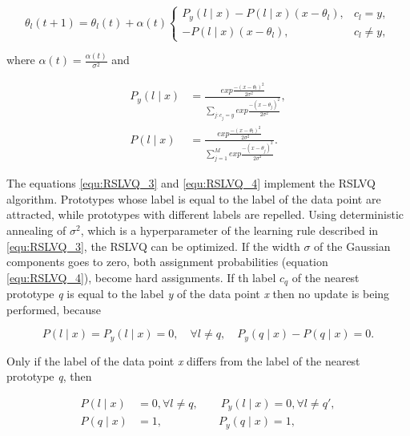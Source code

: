 \documentclass[12pt,oneside,a4paper,parskip]{scrbook}
\begin{document}
\begin{equation}
  \theta_l(t + 1) = \theta_l(t) + \alpha(t) 
  \begin{cases}
    P_y(l\mid x) - P(l\mid x)(x-\theta_l),  &c_l = y,  \\
    - P(l\mid x)(x-\theta_l),               &c_l \neq y,              
  \end{cases}
  \label{equ:RSLVQ_3}
\end{equation}

where $\alpha(t) = \frac{\alpha(t)}{\sigma^2}$ and

\begin{equation}
  \begin{split}
    P_y(l\mid x) &= \frac{exp \frac{-(x-\theta_l)^2}{2\sigma^2}}{\displaystyle\sum_{j:c_j = y} exp \frac{-(x-\theta_j)^2}{2\sigma^2}}, \\
    P(l\mid x) &= \frac{exp \frac{-(x-\theta_l)^2}{2\sigma^2}}{\displaystyle\sum_{j=1}^{M} exp \frac{-(x-\theta_j)^2}{2\sigma^2}}.
  \end{split}
  \label{equ:RSLVQ_4}
\end{equation}

The equations \ref{equ:RSLVQ_3} and \ref{equ:RSLVQ_4} implement the RSLVQ algorithm. Prototypes whose label is equal to 
the label of the data point are attracted, while prototypes with different labels are repelled. Using deterministic annealing
of $\sigma^2$, which is a hyperparameter of the learning rule described in \ref{equ:RSLVQ_3}, the RSLVQ can be optimized.
If the width $\sigma$ of the Gaussian components goes to zero, both assignment probabilities (equation \ref{equ:RSLVQ_4}),
become hard assignments. If th label $c_q$ of the nearest prototype \textit{q} is equal to the label \textit{y} of the data
point \textit{x} then no update is being performed, because 

\begin{equation}
  P(l\mid x) = P_y(l\mid x) = 0, \quad \forall l \neq q, \quad P_y(q\mid x)-P(q\mid x) = 0.
\end{equation}

Only if the label of the data point \textit{x} differs from the label of the nearest prototype \textit{q}, then

\begin{equation}
  \begin{split}
    P(l\mid x) &= 0, \forall l \neq q, \quad \quad P_y(l\mid x) = 0, \forall l \neq q',\\
    P(q\mid x) &= 1, \quad \quad \quad \quad \quad P_y(q\mid x) = 1,
  \end{split}
\end{equation}
\end{document}
